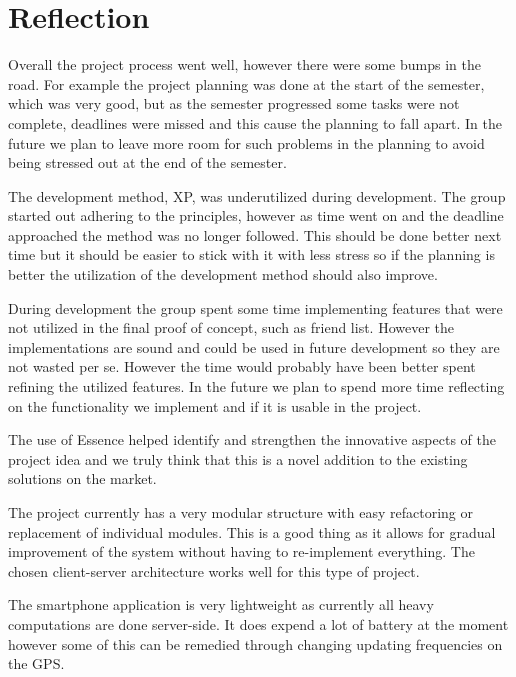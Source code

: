 \section{Reflection}
Overall the project process went well, however there were some bumps in the road. For example the project planning was done at the start of the semester, which was very good, but as the semester progressed some tasks were not complete, deadlines were missed and this cause the planning to fall apart. In the future we plan to leave more room for such problems in the planning to avoid being stressed out at the end of the semester.

The development method, \ac{XP}, was underutilized during development. The group started out adhering to the principles, however as time went on and the deadline approached the method was no longer followed. This should be done better next time but it should be easier to stick with it with less stress so if the planning is better the utilization of the development method should also improve.

During development the group spent some time implementing features that were not utilized in the final proof of concept, such as friend list. However the implementations are sound and could be used in future development so they are not wasted per se. However the time would probably have been better spent refining the utilized features. In the future we plan to spend more time reflecting on the functionality we implement and if it is usable in the project.

The use of Essence helped identify and strengthen the innovative aspects of the project idea and we truly think that this is a novel addition to the existing solutions on the market.

The project currently has a very modular structure with easy refactoring or replacement of individual modules. This is a good thing as it allows for gradual improvement of the system without having to re-implement everything. The chosen client-server architecture works well for this type of project.

The smartphone application is very lightweight as currently all heavy computations are done server-side. It does expend a lot of battery at the moment however some of this can be remedied through changing updating frequencies on the \ac{GPS}. 
